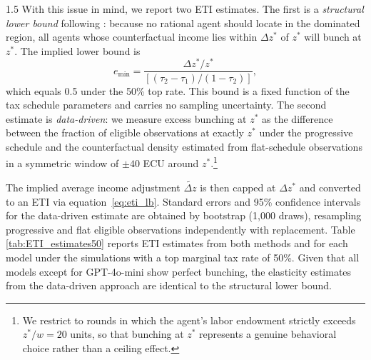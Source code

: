 \documentclass[letterpaper,9pt]{article}
\theoremstyle{definition}
\begin{document}
\begin{spacing}{1.5}
With this issue in mind, we report two ETI estimates. The first is a \textit{structural lower bound} following \citet{KlevenWaseem2013}: because no rational agent should locate in the dominated region, all agents whose counterfactual income lies within $\Delta z^*$ of $z^*$ will bunch at $z^*$. The implied lower bound is
  \begin{equation}
      e_{\min} = \frac{\Delta z^*/z^*}{\left[(\tau_2-\tau_1)/(1-\tau_2)\right]},
      \label{eq:eti_lb}
  \end{equation}
  which equals 0.5 under the 50\% top rate. This bound is a fixed function of the tax schedule parameters and carries no sampling uncertainty. The second estimate is \textit{data-driven}: we measure excess bunching at $z^*$ as the difference between the fraction of eligible observations at exactly $z^*$ under the progressive schedule and the counterfactual density estimated from flat-schedule observations in a symmetric window of $\pm 40$ ECU around $z^*$.\footnote{We restrict to rounds in which the agent's labor endowment strictly exceeds $z^*/w = 20$ units, so that bunching at $z^*$ represents a genuine behavioral choice rather than a ceiling effect.}
  
  The implied average income adjustment $\widetilde{\Delta z}$ is then capped at $\Delta z^*$ and converted to an ETI via equation~\eqref{eq:eti_lb}. Standard errors and 95\% confidence intervals for the data-driven estimate are obtained by bootstrap (1{,}000 draws), resampling progressive and flat eligible observations independently with replacement. Table \ref{tab:ETI_estimates50} reports ETI estimates from both methods and for each model under the simulations with a top marginal tax rate of 50\%.  Given that all models except for GPT-4o-mini show perfect bunching, the elasticity estimates from the data-driven approach are identical to the structural lower bound.

  \begin{table}
    \centering
    \caption{Elasticity of Taxable Income Estimates: 50\% top rate}
    \label{tab:ETI_estimates50}
    
    \end{table}


\end{spacing}
\end{document}
